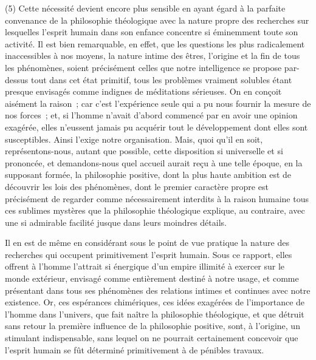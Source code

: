 \documentclass[french,twoside]{book} %
\begin{document}
(5) Cette nécessité devient encore plus sensible en ayant égard à la parfaite convenance de la philosophie théologique avec la nature propre des recherches sur lesquelles l’esprit humain dans son enfance concentre si éminemment toute son activité. Il est bien remarquable, en effet, que les questions les plus radicalement inaccessibles à nos moyens, la nature intime des êtres, l’origine et la fin de tous les phénomènes, soient précisément celles que notre intelligence se propose par-dessus tout dans cet état primitif, tous les problèmes vraiment solubles étant presque envisagés comme indignes de méditations sérieuses. On en conçoit aisément la raison ; car c’est l’expérience seule qui a pu nous fournir la mesure de nos forces ; et, si l’homme n’avait d’abord commencé par en avoir une opinion exagérée, elles n’eussent jamais pu acquérir tout le développement dont elles sont susceptibles. Ainsi l’exige notre organisation. Mais, quoi qu’il en soit, représentons-nous, autant que possible, cette disposition si universelle et si prononcée, et demandons-nous quel accueil aurait reçu à une telle époque, en la supposant formée, la philosophie positive, dont la plus haute ambition est de découvrir les lois des phénomènes, dont le premier caractère propre est précisément de regarder comme nécessairement interdits à la raison humaine tous ces sublimes mystères que la philosophie théologique explique, au contraire, avec une si admirable facilité jusque dans leurs moindres détails.\par
Il en est de même en considérant sous le point de vue pratique la nature des recherches qui occupent primitivement l’esprit humain. Sous ce rapport, elles offrent à l’homme l’attrait si énergique d’un empire illimité à exercer sur le monde extérieur, envisagé comme entièrement destiné à notre usage, et comme présentant dans tous ses phénomènes des relations intimes et continues avec notre existence. Or, ces espérances chimériques, ces idées exagérées de l’importance de l’homme dans l’univers, que fait naître la philosophie théologique, et que détruit sans retour la première influence de la philosophie positive, sont, à l’origine, un stimulant indispensable, sans lequel on ne pourrait certainement concevoir que l’esprit humain se fût déterminé primitivement à de pénibles travaux.\par
\end{document}
